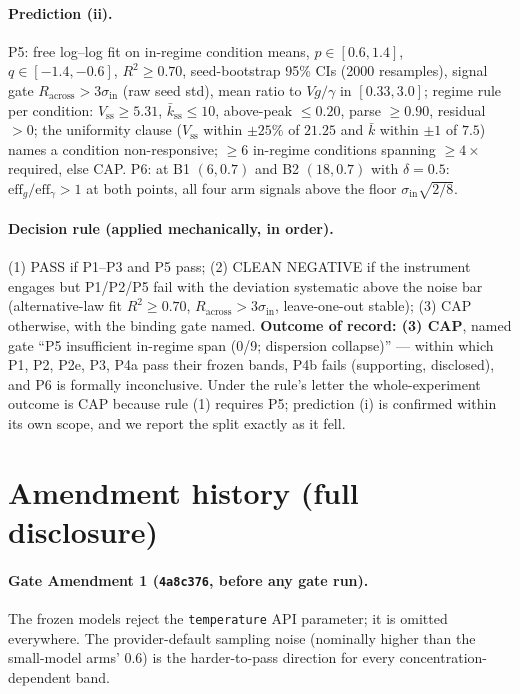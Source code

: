 \documentclass{article} %
\begin{document}
\paragraph{Prediction (ii).} P5: free log--log fit on in-regime condition means, $p \in [0.6, 1.4]$, $q \in [-1.4, -0.6]$, $R^2 \geq 0.70$, seed-bootstrap 95\% CIs (2000 resamples), signal gate $R_{\mathrm{across}} > 3\sigma_{\mathrm{in}}$ (raw seed std), mean ratio to $Vg/\gamma$ in $[0.33, 3.0]$; regime rule per condition: $V_{\mathrm{ss}} \geq 5.31$, $\bar k_{\mathrm{ss}} \leq 10$, above-peak $\leq 0.20$, parse $\geq 0.90$, residual $> 0$; the uniformity clause ($V_{\mathrm{ss}}$ within $\pm 25\%$ of $21.25$ and $\bar k$ within $\pm 1$ of $7.5$) names a condition non-responsive; $\geq 6$ in-regime conditions spanning $\geq 4\times$ required, else CAP. P6: at B1 $(6, 0.7)$ and B2 $(18, 0.7)$ with $\delta = 0.5$: $\mathrm{eff}_g/\mathrm{eff}_\gamma > 1$ at both points, all four arm signals above the floor $\sigma_{\mathrm{in}}\sqrt{2/8}$.

\paragraph{Decision rule (applied mechanically, in order).} (1) PASS if P1--P3 and P5 pass; (2) CLEAN NEGATIVE if the instrument engages but P1/P2/P5 fail with the deviation systematic above the noise bar (alternative-law fit $R^2 \geq 0.70$, $R_{\mathrm{across}} > 3\sigma_{\mathrm{in}}$, leave-one-out stable); (3) CAP otherwise, with the binding gate named. \textbf{Outcome of record: (3) CAP}, named gate ``P5 insufficient in-regime span (0/9; dispersion collapse)'' --- within which P1, P2, P2e, P3, P4a pass their frozen bands, P4b fails (supporting, disclosed), and P6 is formally inconclusive. Under the rule's letter the whole-experiment outcome is CAP because rule (1) requires P5; prediction (i) is confirmed within its own scope, and we report the split exactly as it fell.

\section{Amendment history (full disclosure)}
\label{app:amendments}

\paragraph{Gate Amendment 1 (\texttt{4a8c376}, before any gate run).} The frozen models reject the \texttt{temperature} API parameter; it is omitted everywhere. The provider-default sampling noise (nominally higher than the small-model arms' $0.6$) is the harder-to-pass direction for every concentration-dependent band.
\end{document}
